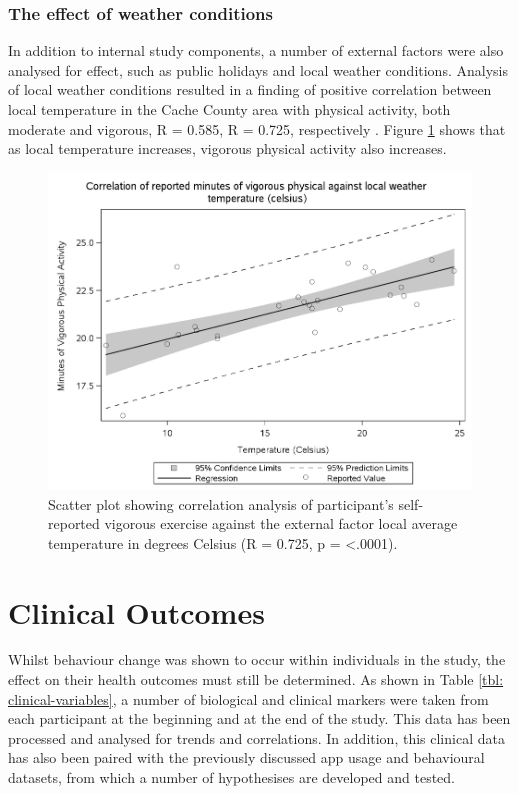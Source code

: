 \subsubsection{The effect of weather conditions}
In addition to internal study components, a number of external factors were also analysed for effect, such as public holidays and local weather conditions.
Analysis of local weather conditions resulted in a finding of positive correlation between local temperature in the Cache County area with physical activity, both moderate and vigorous, R = 0.585, R = 0.725, respectively \cite{Hartin2015-ICOST}. Figure \ref{fig: scatter-regression-temp-activity} shows that as local temperature increases, vigorous physical activity also increases.

\begin{figure}[h]
    \centering
    \includegraphics[scale=0.4, angle=0]{Files/prevention-study-3/figures/correlation-temp-activity}
    \caption{Scatter plot showing correlation analysis of participant’s self-reported vigorous exercise against the external factor local average temperature in degrees Celsius (R = 0.725, p = \textless.0001).}
    \label{fig: scatter-regression-temp-activity}
\end{figure}

\section{Clinical Outcomes}
Whilst behaviour change was shown to occur within individuals in the study, the effect on their health outcomes must still be determined. As shown in Table \ref{tbl: clinical-variables}, a number of biological and clinical markers were taken from each participant at the beginning and at the end of the study. This data has been processed and analysed for trends and correlations. In addition, this clinical data has also been paired with the previously discussed app usage and behavioural datasets, from which a number of hypothesises are developed and tested.


